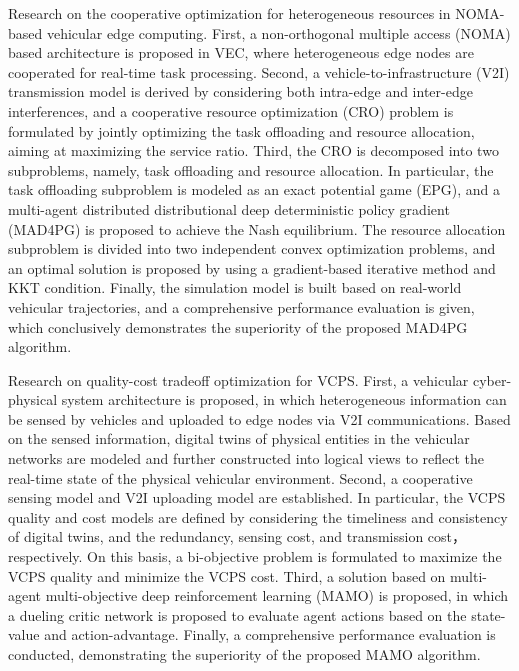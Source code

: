 \begin{eabstract}
 Research on the cooperative optimization for heterogeneous resources in NOMA-based vehicular edge computing.
First, a non-orthogonal multiple access (NOMA) based architecture is proposed in VEC, where heterogeneous edge nodes are cooperated for real-time task processing. 
Second, a vehicle-to-infrastructure (V2I) transmission model is derived by considering both intra-edge and inter-edge interferences, and a cooperative resource optimization (CRO) problem is formulated by jointly optimizing the task offloading and resource allocation, aiming at maximizing the service ratio.
Third, the CRO is decomposed into two subproblems, namely, task offloading and resource allocation.
In particular, the task offloading subproblem is modeled as an exact potential game (EPG), and a multi-agent distributed distributional deep deterministic policy gradient (MAD4PG) is proposed to achieve the Nash equilibrium. 
The resource allocation subproblem is divided into two independent convex optimization problems, and an optimal solution is proposed by using a gradient-based iterative method and KKT condition. 
Finally, the simulation model is built based on real-world vehicular trajectories, and a comprehensive performance evaluation is given, which conclusively demonstrates the superiority of the proposed MAD4PG algorithm.
 
 Research on quality-cost tradeoff optimization for VCPS.
First, a vehicular cyber-physical system architecture is proposed, in which heterogeneous information can be sensed by vehicles and uploaded to edge nodes via V2I communications. 
Based on the sensed information, digital twins of physical entities in the vehicular networks are modeled and further constructed into logical views to reflect the real-time state of the physical vehicular environment.
Second, a cooperative sensing model and V2I uploading model are established.
In particular, the VCPS quality and cost models are defined by considering the timeliness and consistency of digital twins, and the redundancy, sensing cost, and transmission cost，respectively. 
On this basis, a bi-objective problem is formulated to maximize the VCPS quality and minimize the VCPS cost.
Third, a solution based on multi-agent multi-objective deep reinforcement learning (MAMO) is proposed, in which a dueling critic network is proposed to evaluate agent actions based on the state-value and action-advantage.
Finally, a comprehensive performance evaluation is conducted, demonstrating the superiority of the proposed MAMO algorithm.


\end{eabstract}
